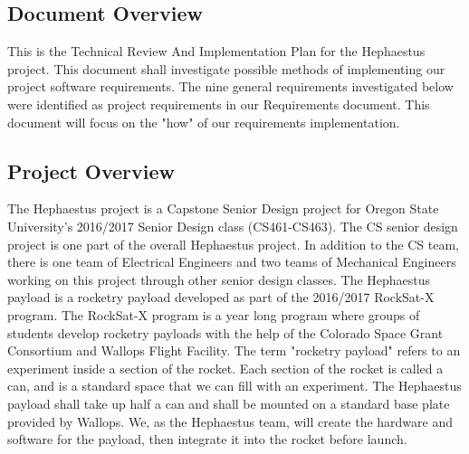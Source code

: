 \documentclass[letterpaper,10pt]{article}
\begin{document}
\subsection{Document Overview}
This is the Technical Review And Implementation Plan for the Hephaestus project.
This document shall investigate possible methods of implementing our project software requirements.
The nine general requirements investigated below were identified as project requirements in our Requirements document.
This document will focus on the "how" of our requirements implementation.
\subsection{Project Overview}
The Hephaestus project is a Capstone Senior Design project for Oregon State University's 2016/2017 Senior Design class (CS461-CS463).
The CS senior design project is one part of the overall Hephaestus project.
In addition to the CS team, there is one team of Electrical Engineers and two teams of Mechanical Engineers working on this project through other senior design classes.
The Hephaestus \gls{payload} is a rocketry \gls{payload} developed as part of the 2016/2017 RockSat-X program.
The RockSat-X program is a year long program where groups of students develop rocketry payloads with the help of the Colorado Space Grant Consortium and Wallops Flight Facility.
The term "rocketry payload" refers to an experiment inside a section of the rocket.
Each section of the rocket is called a can, and is a standard space that we can fill with an experiment.
The Hephaestus payload shall take up half a can and shall be mounted on a standard base plate provided by Wallops.
We, as the Hephaestus team, will create the hardware and software for the payload, then integrate it into the rocket before launch.
\end{document}
